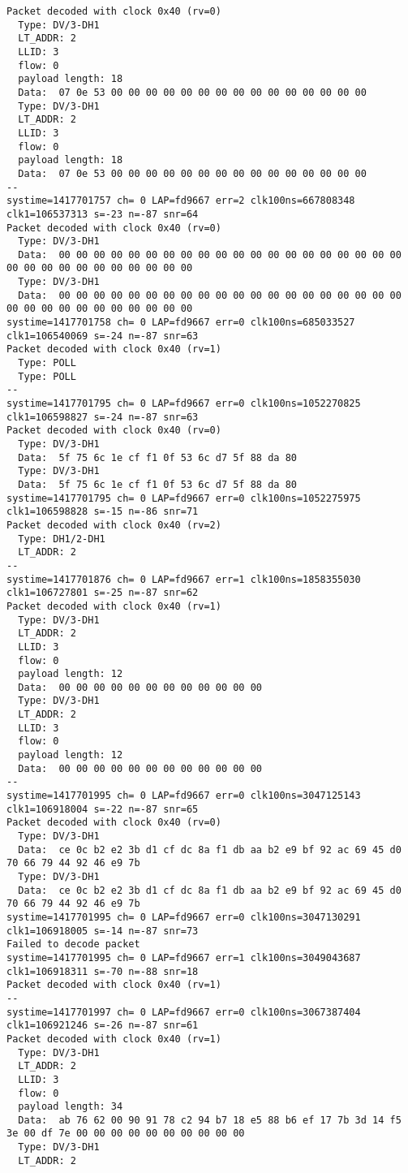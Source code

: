 \begin{verbatim}
Packet decoded with clock 0x40 (rv=0)
  Type: DV/3-DH1
  LT_ADDR: 2
  LLID: 3
  flow: 0
  payload length: 18
  Data:  07 0e 53 00 00 00 00 00 00 00 00 00 00 00 00 00 00 00
  Type: DV/3-DH1
  LT_ADDR: 2
  LLID: 3
  flow: 0
  payload length: 18
  Data:  07 0e 53 00 00 00 00 00 00 00 00 00 00 00 00 00 00 00
--
systime=1417701757 ch= 0 LAP=fd9667 err=2 clk100ns=667808348 clk1=106537313 s=-23 n=-87 snr=64
Packet decoded with clock 0x40 (rv=0)
  Type: DV/3-DH1
  Data:  00 00 00 00 00 00 00 00 00 00 00 00 00 00 00 00 00 00 00 00 00 00 00 00 00 00 00 00 00 00 00
  Type: DV/3-DH1
  Data:  00 00 00 00 00 00 00 00 00 00 00 00 00 00 00 00 00 00 00 00 00 00 00 00 00 00 00 00 00 00 00
systime=1417701758 ch= 0 LAP=fd9667 err=0 clk100ns=685033527 clk1=106540069 s=-24 n=-87 snr=63
Packet decoded with clock 0x40 (rv=1)
  Type: POLL
  Type: POLL
--
systime=1417701795 ch= 0 LAP=fd9667 err=0 clk100ns=1052270825 clk1=106598827 s=-24 n=-87 snr=63
Packet decoded with clock 0x40 (rv=0)
  Type: DV/3-DH1
  Data:  5f 75 6c 1e cf f1 0f 53 6c d7 5f 88 da 80
  Type: DV/3-DH1
  Data:  5f 75 6c 1e cf f1 0f 53 6c d7 5f 88 da 80
systime=1417701795 ch= 0 LAP=fd9667 err=0 clk100ns=1052275975 clk1=106598828 s=-15 n=-86 snr=71
Packet decoded with clock 0x40 (rv=2)
  Type: DH1/2-DH1
  LT_ADDR: 2
--
systime=1417701876 ch= 0 LAP=fd9667 err=1 clk100ns=1858355030 clk1=106727801 s=-25 n=-87 snr=62
Packet decoded with clock 0x40 (rv=1)
  Type: DV/3-DH1
  LT_ADDR: 2
  LLID: 3
  flow: 0
  payload length: 12
  Data:  00 00 00 00 00 00 00 00 00 00 00 00
  Type: DV/3-DH1
  LT_ADDR: 2
  LLID: 3
  flow: 0
  payload length: 12
  Data:  00 00 00 00 00 00 00 00 00 00 00 00
--
systime=1417701995 ch= 0 LAP=fd9667 err=0 clk100ns=3047125143 clk1=106918004 s=-22 n=-87 snr=65
Packet decoded with clock 0x40 (rv=0)
  Type: DV/3-DH1
  Data:  ce 0c b2 e2 3b d1 cf dc 8a f1 db aa b2 e9 bf 92 ac 69 45 d0 70 66 79 44 92 46 e9 7b
  Type: DV/3-DH1
  Data:  ce 0c b2 e2 3b d1 cf dc 8a f1 db aa b2 e9 bf 92 ac 69 45 d0 70 66 79 44 92 46 e9 7b
systime=1417701995 ch= 0 LAP=fd9667 err=0 clk100ns=3047130291 clk1=106918005 s=-14 n=-87 snr=73
Failed to decode packet
systime=1417701995 ch= 0 LAP=fd9667 err=1 clk100ns=3049043687 clk1=106918311 s=-70 n=-88 snr=18
Packet decoded with clock 0x40 (rv=1)
--
systime=1417701997 ch= 0 LAP=fd9667 err=0 clk100ns=3067387404 clk1=106921246 s=-26 n=-87 snr=61
Packet decoded with clock 0x40 (rv=1)
  Type: DV/3-DH1
  LT_ADDR: 2
  LLID: 3
  flow: 0
  payload length: 34
  Data:  ab 76 62 00 90 91 78 c2 94 b7 18 e5 88 b6 ef 17 7b 3d 14 f5 3e 00 df 7e 00 00 00 00 00 00 00 00 00 00
  Type: DV/3-DH1
  LT_ADDR: 2

\end{verbatim}
